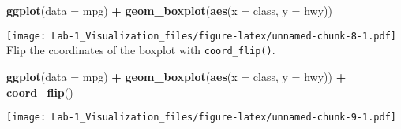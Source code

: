 \documentclass[]{article}
\newenvironment{Shaded}{\begin{snugshade}}{\end{snugshade}}
\newcommand{\DataTypeTok}[1]{\textcolor[rgb]{0.13,0.29,0.53}{#1}}
\newcommand{\KeywordTok}[1]{\textcolor[rgb]{0.13,0.29,0.53}{\textbf{#1}}}
\newcommand{\NormalTok}[1]{#1}
\newcommand{\OperatorTok}[1]{\textcolor[rgb]{0.81,0.36,0.00}{\textbf{#1}}}
\newcommand{\StringTok}[1]{\textcolor[rgb]{0.31,0.60,0.02}{#1}}
\begin{document}
\begin{Shaded}
\begin{Highlighting}[]
\KeywordTok{ggplot}\NormalTok{(}\DataTypeTok{data =}\NormalTok{ mpg) }\OperatorTok{+}\StringTok{ }
\StringTok{    }\KeywordTok{geom_boxplot}\NormalTok{(}\KeywordTok{aes}\NormalTok{(}\DataTypeTok{x =}\NormalTok{ class, }\DataTypeTok{y =}\NormalTok{ hwy))}
\end{Highlighting}
\end{Shaded}

\texttt{[image: Lab-1\_Visualization\_files/figure-latex/unnamed-chunk-8-1.pdf]}
Flip the coordinates of the boxplot with \texttt{coord\_flip()}.

\begin{Shaded}
\begin{Highlighting}[]
\KeywordTok{ggplot}\NormalTok{(}\DataTypeTok{data =}\NormalTok{ mpg) }\OperatorTok{+}\StringTok{ }
\StringTok{    }\KeywordTok{geom_boxplot}\NormalTok{(}\KeywordTok{aes}\NormalTok{(}\DataTypeTok{x =}\NormalTok{ class, }\DataTypeTok{y =}\NormalTok{ hwy)) }\OperatorTok{+}
\StringTok{  }\KeywordTok{coord_flip}\NormalTok{()}
\end{Highlighting}
\end{Shaded}

\texttt{[image: Lab-1\_Visualization\_files/figure-latex/unnamed-chunk-9-1.pdf]}
\end{document}
